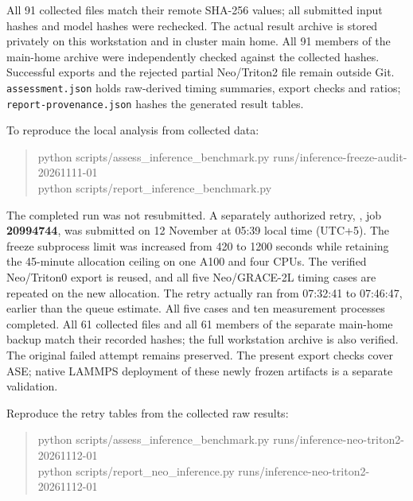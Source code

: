 \documentclass[11pt,a4paper]{article}
\begin{document}
All 91 collected files match their remote SHA-256 values; all submitted input
hashes and model hashes were rechecked. The actual result archive is stored
privately on this workstation and in cluster main home. All 91 members of the
main-home archive were independently checked against the collected hashes.
Successful exports and the rejected partial Neo/Triton2 file remain outside Git.
\texttt{assessment.json} holds raw-derived timing summaries, export checks and
ratios; \texttt{report-provenance.json} hashes the generated result tables.

To reproduce the local analysis from collected data:
\begin{quote}\ttfamily\small
python scripts/assess\_inference\_benchmark.py runs/inference-freeze-audit-20261111-01\\
python scripts/report\_inference\_benchmark.py
\end{quote}
The completed run was not resubmitted. A separately authorized retry,
, job \textbf{20994744}, was submitted
on 12 November at 05:39 local time (UTC+5). The freeze subprocess limit was
increased from 420 to 1200 seconds while retaining the 45-minute allocation
ceiling on one A100 and four CPUs. The verified Neo/Triton0 export is reused,
and all five Neo/GRACE-2L timing cases are repeated on the new allocation.
The retry actually ran from 07:32:41 to 07:46:47, earlier than the queue estimate.
All five cases and ten measurement processes completed. All 61 collected files
and all 61 members of the separate main-home backup match their recorded hashes;
the full workstation archive is also verified. The original failed attempt
remains preserved. The present export checks cover ASE; native LAMMPS deployment
of these newly frozen artifacts is a separate validation.

Reproduce the retry tables from the collected raw results:
\begin{quote}\ttfamily\small
python scripts/assess\_inference\_benchmark.py runs/inference-neo-triton2-20261112-01\\
python scripts/report\_neo\_inference.py runs/inference-neo-triton2-20261112-01
\end{quote}
\end{document}
